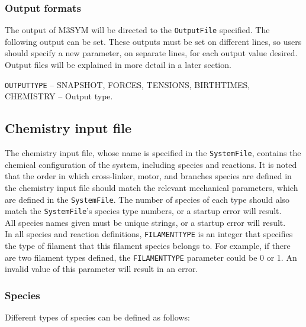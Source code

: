 \documentclass[11pt, oneside]{article}   	%
\begin{document}
\subsubsection{Output formats}

The output of M3SYM will be directed to the \texttt{OutputFile} specified. The following output can be set. These outputs must be set on different lines, so users should specify a new parameter, on separate lines, for each output value desired. Output files will be explained in more detail in a later section.\\

\small

  \noindent\texttt{OUTPUTTYPE} -- SNAPSHOT, FORCES, TENSIONS, BIRTHTIMES, CHEMISTRY -- Output type.\\
 
\normalsize


\subsection{Chemistry input file}
The chemistry input file, whose name is specified in the \texttt{SystemFile}, contains the chemical configuration of the system, including species and reactions. It is noted that the order in which cross-linker, motor, and branches species are defined in the chemistry input file should match the relevant mechanical parameters, which are defined in the \texttt{SystemFile}. The number of species of each type should also match the \texttt{SystemFile}'s species type numbers, or a startup error will result. \\

\noindent All species names given must be unique strings, or a startup error will result.\\

\noindent In all species and reaction definitions, \texttt{FILAMENTTYPE} is an integer that specifies the type of filament that this filament species belongs to. For example, if there are two filament types defined, the \texttt{FILAMENTTYPE} parameter could be 0 or 1. An invalid value of this parameter will result in an error.

\subsubsection{Species}
Different types of species can be defined as follows:
\end{document}
